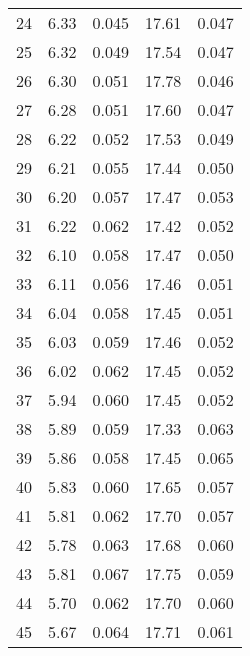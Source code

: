 \begin{table}
\begin{tabular}{c|ll|ll}
24 & 6.33 & 0.045 & 17.61 & 0.047 \\
25 & 6.32 & 0.049 & 17.54 & 0.047 \\
26 & 6.30 & 0.051 & 17.78 & 0.046 \\
27 & 6.28 & 0.051 & 17.60 & 0.047 \\
28 & 6.22 & 0.052 & 17.53 & 0.049 \\
29 & 6.21 & 0.055 & 17.44 & 0.050 \\
30 & 6.20 & 0.057 & 17.47 & 0.053 \\
31 & 6.22 & 0.062 & 17.42 & 0.052 \\
32 & 6.10 & 0.058 & 17.47 & 0.050 \\
33 & 6.11 & 0.056 & 17.46 & 0.051 \\
34 & 6.04 & 0.058 & 17.45 & 0.051 \\
35 & 6.03 & 0.059 & 17.46 & 0.052 \\
36 & 6.02 & 0.062 & 17.45 & 0.052 \\
37 & 5.94 & 0.060 & 17.45 & 0.052 \\
38 & 5.89 & 0.059 & 17.33 & 0.063 \\
39 & 5.86 & 0.058 & 17.45 & 0.065 \\
40 & 5.83 & 0.060 & 17.65 & 0.057 \\
41 & 5.81 & 0.062 & 17.70 & 0.057 \\
42 & 5.78 & 0.063 & 17.68 & 0.060 \\
43 & 5.81 & 0.067 & 17.75 & 0.059 \\
44 & 5.70 & 0.062 & 17.70 & 0.060 \\
45 & 5.67 & 0.064 & 17.71 & 0.061 \\
               \hline
        \end{tabular}
    \end{table}
    \clearpage

